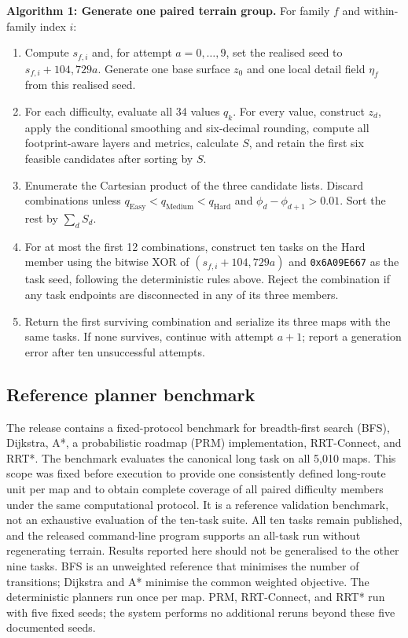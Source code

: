 \documentclass[11pt]{article}
\begin{document}
\noindent\textbf{Algorithm 1: Generate one paired terrain group.}
For family $f$ and within-family index $i$:
\begin{enumerate}
  \item Compute $s_{f,i}$ and, for attempt $a=0,\ldots,9$, set the realised
  seed to $s_{f,i}+104{,}729a$. Generate one base surface $z_0$ and one local
  detail field $\eta_f$ from this realised seed.
  \item For each difficulty, evaluate all 34 values $q_k$. For every value,
  construct $z_d$, apply the conditional smoothing and six-decimal rounding,
  compute all footprint-aware layers and metrics, calculate $S$, and retain the
  first six feasible candidates after sorting by $S$.
  \item Enumerate the Cartesian product of the three candidate lists. Discard
  combinations unless $q_{\mathrm{Easy}}<q_{\mathrm{Medium}}<q_{\mathrm{Hard}}$
  and $\phi_{d}-\phi_{d+1}>0.01$. Sort the rest by $\sum_d S_d$.
  \item For at most the first 12 combinations, construct ten tasks on the Hard
  member using the bitwise XOR of $(s_{f,i}+104{,}729a)$ and
  \texttt{0x6A09E667} as the task seed, following the deterministic rules
  above. Reject the combination if any task endpoints are
  disconnected in any of its three members.
  \item Return the first surviving combination and serialize its three maps
  with the same tasks. If none survives, continue with attempt $a+1$; report a
  generation error after ten unsuccessful attempts.
\end{enumerate}

\subsection{Reference planner benchmark}

The release contains a fixed-protocol benchmark for breadth-first search (BFS),
Dijkstra\cite{dijkstra}, A*\cite{astar}, a probabilistic roadmap (PRM)
implementation\cite{prm}, RRT-Connect\cite{rrtconnect}, and
RRT*\cite{rrtstar}. The benchmark evaluates the canonical long task on all
5,010 maps. This scope was fixed before execution to provide one consistently
defined long-route unit per map and to obtain complete coverage of all paired
difficulty members under the same computational protocol. It is a reference
validation benchmark, not an exhaustive evaluation of the ten-task suite. All
ten tasks remain published, and the released command-line program supports an
all-task run without regenerating terrain. Results reported here should not be
generalised to the other nine tasks. BFS is an unweighted reference that
minimises the number of transitions; Dijkstra and A* minimise the common
weighted objective. The deterministic planners run once per map. PRM,
RRT-Connect, and RRT* run with five fixed seeds; the system performs no
additional reruns beyond these five documented seeds.
\end{document}
